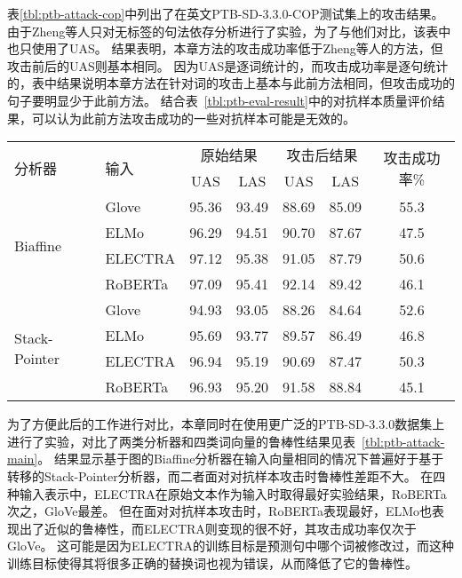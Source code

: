 表\ref{tbl:ptb-attack-cop}中列出了在英文PTB-SD-3.3.0-COP测试集上的攻击结果。
由于Zheng等人只对无标签的句法依存分析进行了实验，为了与他们对比，该表中也只使用了UAS。
结果表明，本章方法的攻击成功率低于Zheng等人的方法，但攻击前后的UAS则基本相同。
因为UAS是逐词统计的，而攻击成功率是逐句统计的，表中结果说明本章方法在针对词的攻击上基本与此前方法相同，但攻击成功的句子要明显少于此前方法。
结合表~\ref{tbl:ptb-eval-result}中的对抗样本质量评价结果，可以认为此前方法攻击成功的一些对抗样本可能是无效的。

\begin{table}[htbp]
    \vspace{0.5em}\centering\wuhao
	\begin{tabular}{llccccc}
		\toprule[1.5pt]
		\multirow{2}{*}{分析器}&\multirow{2}{*}{输入}& \multicolumn{2}{c}{原始结果} & \multicolumn{2}{c}{攻击后结果} & \multirow{2}{*}{攻击成功率\%} \\
		\cmidrule(r){3-4} \cmidrule(r){5-6}
		& & UAS & LAS & UAS & LAS \\
		\midrule[1pt]
		\multirow{4}{*}{ Biaffine} & Glove &95.36 & 93.49 &88.69 &85.09 &55.3 \\
		& ELMo  &96.29 &94.51  &90.70 &87.67 &47.5 \\
		& ELECTRA &97.12 & 95.38 &91.05 &87.79 &50.6 \\
		& RoBERTa &97.09 & 95.41 &92.14 &89.42 &46.1 \\
		\hline
		\multirow{4}{*}{ Stack-Pointer} & Glove &94.93 & 93.05 &88.26 &84.64 &52.6 \\
		& ELMo    &95.69 & 93.77 &89.57 &86.49 &46.8 \\
		& ELECTRA &96.94 & 95.19 &90.69 &87.47 &50.3 \\
		& RoBERTa &96.93 & 95.20 &91.58 &88.84 &45.1 \\
		\bottomrule[1.5pt]
	\end{tabular}
\end{table}

为了方便此后的工作进行对比，本章同时在使用更广泛的PTB-SD-3.3.0数据集上进行了实验，对比了两类分析器和四类词向量的鲁棒性结果见表~\ref{tbl:ptb-attack-main}。
结果显示基于图的Biaffine分析器在输入向量相同的情况下普遍好于基于转移的Stack-Pointer分析器，而二者面对对抗样本攻击时鲁棒性差距不大。
在四种输入表示中，ELECTRA在原始文本作为输入时取得最好实验结果，RoBERTa次之，GloVe最差。
但在面对对抗样本攻击时，RoBERTa表现最好，ELMo也表现出了近似的鲁棒性，而ELECTRA则变现的很不好，其攻击成功率仅次于GloVe。
这可能是因为ELECTRA的训练目标是预测句中哪个词被修改过，而这种训练目标使得其将很多正确的替换词也视为错误，从而降低了它的鲁棒性。


